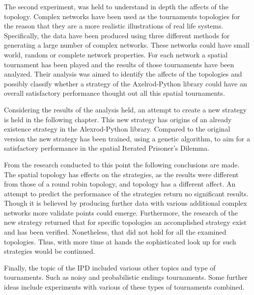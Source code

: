 The second experiment, was held to understand in depth the affects of the
topology. Complex networks have been used as the tournaments topologies for the
reason that they are a more realistic illustrations of real life systems.
Specifically, the data have been produced using three different methods for
generating a large number of complex networks. These networks could have small world,
random or complete network properties. For each network a spatial tournament has
been played and the results of those tournaments have been analyzed. Their analysis
was aimed to identify the affects of the topologies and possibly classify whether
a strategy of the Axelrod-Python library could have an overall satisfactory performance
thought out all this spatial tournaments.

Considering the results of the analysis held, an attempt to create a new strategy
is held in the following chapter. This new strategy has origins of an already existence
strategy in the Alexrod-Python library. Compared to the original version the new
strategy has been trained, using a genetic algorithm, to aim for a satisfactory
performance in the spatial Iterated Prisoner's Dilemma.

From the research conducted to this point the following conclusions are made.
The spatial topology has effects on the strategies, as the results were different
from those of a round robin topology, and topology has a different affect. An attempt
to predict the performance of the strategies return no significant results. Though
it is believed by producing further data with various additional complex networks
more validate points could emerge. Furthermore, the research of the new strategy
returned that for specific topologies an accomplished strategy exist and has been
verified. Nonetheless, that did not hold for all the examined topologies. Thus,
with more time at hands the sophisticated look up for such strategies would be
continued.

Finally, the topic of the IPD included various other topics and type of tournaments.
Such as noisy and probabilistic endings tournaments. Some further ideas include
experiments with various of these types of tournaments combined.
